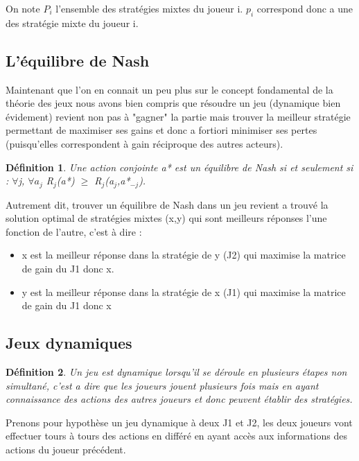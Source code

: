 \documentclass[a4paper, 12pt, twoside]{article}
\newtheorem{definition}{Définition}
\begin{document}
On note $P_{i} $ l'ensemble des stratégies mixtes du joueur i. $ p_{i} $ correspond donc a une des stratégie mixte du joueur i.

\subsection{L'équilibre de Nash}
Maintenant que l'on en connait un peu plus sur le concept fondamental de la \textsf{théorie des jeux} nous avons bien compris que résoudre un jeu (dynamique bien évidement) revient non pas à "gagner" la partie mais trouver la meilleur stratégie permettant de maximiser ses gains et donc a fortiori minimiser ses pertes (puisqu'elles correspondent à gain réciproque des autres acteurs). \newline


\begin{definition}
Une action conjointe a* est un équilibre de Nash si et seulement si : $ \forall $j, $ \forall a_{j}$ R$ _{j} $(a*) $ \geq $ R$ _{j} $(a$ _{j} $,a*$ _{-j} $).
\end{definition}
Autrement dit, trouver \textsf{un équilibre de Nash} dans un jeu revient a trouvé la solution optimal de stratégies mixtes (x,y) qui sont meilleurs réponses l'une fonction de l'autre, c'est à dire :
\begin{itemize}
\item x est la meilleur réponse dans la stratégie de y (J2) qui maximise la matrice de gain du J1 donc x.
\item y est la meilleur réponse dans la stratégie de x (J1) qui maximise la matrice de gain du J1  donc x
\end{itemize}  


\subsection{Jeux dynamiques}
\begin{definition}
Un jeu est dynamique lorsqu'il se déroule en plusieurs étapes non simultané, c'est a dire que les joueurs jouent plusieurs fois mais en ayant connaissance des actions des autres joueurs et donc peuvent établir des stratégies.
\end{definition}

Prenons pour hypothèse un jeu dynamique à deux  J1 et J2, les deux joueurs vont effectuer tours à tours des actions en différé en ayant accès aux informations des actions du joueur précédent. \newline
\end{document}
